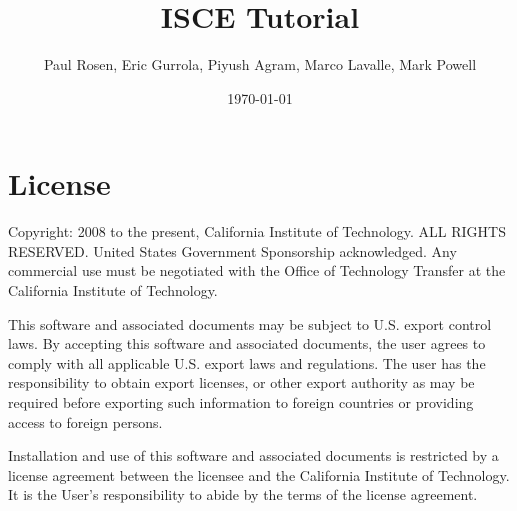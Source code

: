 \documentclass[11pt]{book}
\title{ISCE Tutorial}
\author{
  Paul Rosen,
  Eric Gurrola,
  Piyush Agram,
  Marco Lavalle,
  Mark Powell
}
\affil{NASA Jet Propulsion Laboratory, California Institute of Technology}
\date{\today}                             %
\begin{document}
\maketitle
\tableofcontents

\setcounter{chapter}{-1}

\chapter{License}
Copyright: 2008 to the present, California Institute of Technology.
ALL RIGHTS RESERVED. United States Government Sponsorship acknowledged.
Any commercial use must be negotiated with the Office of Technology Transfer
at the California Institute of Technology.

This software and associated documents may be subject to U.S. export control
laws. By accepting this software and associated documents, the user agrees to
comply with all applicable U.S. export laws and regulations. The user has the
responsibility to obtain export licenses,  or other export authority as may be
required before exporting such information to foreign countries or providing
access to foreign persons.

Installation and use of this software and associated documents is restricted
by a license agreement between the licensee and the California Institute of
Technology. It is the User's responsibility to abide by the terms of the
license agreement.
\end{document}
